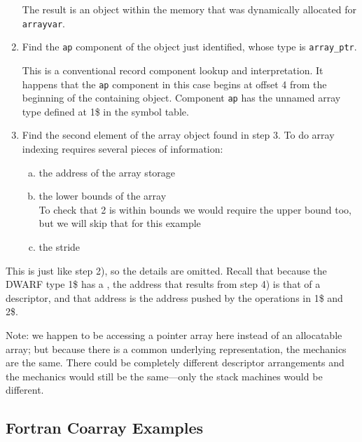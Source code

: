\begin{enumerate}[1. ]
The result is an object within the memory that was dynamically
allocated for \texttt{arrayvar}.

\item  Find the \texttt{ap} component of the object just identified,
whose type is \texttt{array\_ptr}.

This is a conventional record component lookup and
interpretation. It happens that the \texttt{ap} component in this case
begins at offset 4 from the beginning of the containing object.
Component \texttt{ap} has the unnamed array type defined at 1\$ in the
symbol table.

\item  Find the second element of the array object found in step 3. To do array indexing requires
several pieces of information:
\begin{enumerate}[a) ]
\item  the address of the array storage

\item  the lower bounds of the array \\
\lbrack To check that 2 is within bounds we would require the upper
bound too, but we will skip that for this example \rbrack

\item  the stride

\end{enumerate}
\end{enumerate}

This is just like step 2), so the details are omitted. Recall
that because the DWARF type 1\$ has a ,
the address that results from step 4) is that of a
descriptor, and that address is the address pushed by the
 operations in 1\$ and 2\$.

Note: we happen to be accessing a pointer array here instead
of an allocatable array; but because there is a common
underlying representation, the mechanics are the same. There
could be completely different descriptor arrangements and the
mechanics would still be the same---only the stack machines
would be different.

\subsection{Fortran Coarray Examples}
\label{app:Fortrancoarrayexamples}

